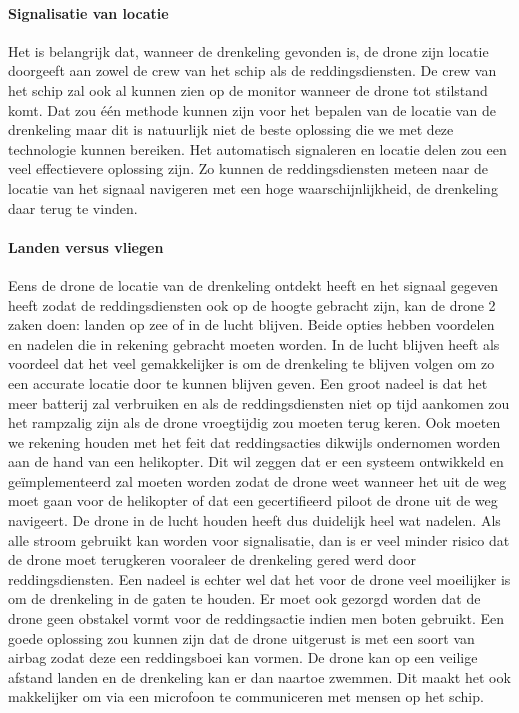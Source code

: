 \paragraph{Signalisatie van locatie}

Het is belangrijk dat, wanneer de drenkeling gevonden is, de drone zijn locatie doorgeeft aan zowel de crew van het schip als de reddingsdiensten. De crew van het schip zal ook al kunnen zien op de monitor wanneer de drone tot stilstand komt. Dat zou één methode kunnen zijn voor het bepalen van de locatie van de drenkeling maar dit is natuurlijk niet de beste oplossing die we met deze technologie kunnen bereiken. Het automatisch signaleren en locatie delen zou een veel effectievere oplossing zijn. Zo kunnen de reddingsdiensten meteen naar de locatie van het signaal navigeren met een hoge waarschijnlijkheid, de drenkeling daar terug te vinden.  

\paragraph{Landen versus vliegen}

Eens de drone de locatie van de drenkeling ontdekt heeft en het signaal gegeven heeft zodat de reddingsdiensten ook op de hoogte gebracht zijn, kan de drone 2 zaken doen: landen op zee of in de lucht blijven. Beide opties hebben voordelen en nadelen die in rekening gebracht moeten worden. In de lucht blijven heeft als voordeel dat het veel gemakkelijker is om de drenkeling te blijven volgen om zo een accurate locatie door te kunnen blijven geven. Een groot nadeel is dat het  meer batterij zal verbruiken en als de reddingsdiensten niet op tijd aankomen zou het rampzalig zijn als de drone vroegtijdig zou moeten terug keren. Ook moeten we rekening houden met het feit dat reddingsacties dikwijls ondernomen worden aan de hand van een helikopter. Dit wil zeggen dat er een systeem ontwikkeld en geïmplementeerd zal moeten worden zodat de drone weet wanneer het uit de weg moet gaan voor de helikopter of dat een gecertifieerd piloot de drone uit de weg navigeert. De drone in de lucht houden heeft dus duidelijk heel wat nadelen. Als alle stroom gebruikt kan worden voor signalisatie, dan is er veel minder risico dat de drone moet terugkeren vooraleer de drenkeling gered werd door reddingsdiensten. Een nadeel is echter wel dat het voor de drone veel moeilijker is om de drenkeling in de gaten te houden. Er moet ook gezorgd worden dat de drone geen obstakel vormt voor de reddingsactie indien men boten gebruikt. Een goede oplossing zou kunnen zijn dat de drone uitgerust is met een soort van airbag zodat deze een reddingsboei kan vormen. De drone kan op een veilige afstand landen en de drenkeling kan er dan naartoe zwemmen. Dit maakt het ook makkelijker om via een microfoon te communiceren met mensen op het schip. 

